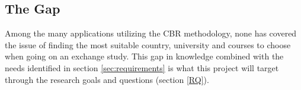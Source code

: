 \subsection{The Gap}

Among the many applications utilizing the CBR methodology, none has covered the issue of finding the most suitable country, university and courses to choose when going on an exchange study. This gap in knowledge combined with the needs identified in section \ref{sec:requirements} is what this project will target through the research goals and questions (section \ref{RQ}).  


